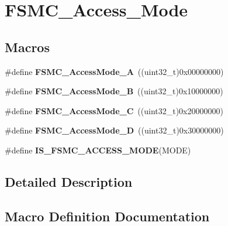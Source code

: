 \hypertarget{group___f_s_m_c___access___mode}{}\section{F\+S\+M\+C\+\_\+\+Access\+\_\+\+Mode}
\label{group___f_s_m_c___access___mode}
\subsection*{Macros}
\begin{DoxyCompactItemize}
\item 
\hypertarget{group___f_s_m_c___access___mode_gae0f299b51c12257311694c4a8f5c00c3}{}\#define {\bfseries F\+S\+M\+C\+\_\+\+Access\+Mode\+\_\+\+A}~((uint32\+\_\+t)0x00000000)\label{group___f_s_m_c___access___mode_gae0f299b51c12257311694c4a8f5c00c3}

\item 
\hypertarget{group___f_s_m_c___access___mode_ga2d6ce7481eb5e0e86fda727c646e4109}{}\#define {\bfseries F\+S\+M\+C\+\_\+\+Access\+Mode\+\_\+\+B}~((uint32\+\_\+t)0x10000000)\label{group___f_s_m_c___access___mode_ga2d6ce7481eb5e0e86fda727c646e4109}

\item 
\hypertarget{group___f_s_m_c___access___mode_ga83ffa035cf2e95c957b67a2e8b879e86}{}\#define {\bfseries F\+S\+M\+C\+\_\+\+Access\+Mode\+\_\+\+C}~((uint32\+\_\+t)0x20000000)\label{group___f_s_m_c___access___mode_ga83ffa035cf2e95c957b67a2e8b879e86}

\item 
\hypertarget{group___f_s_m_c___access___mode_ga7c632e7ebeb0c0ab4919bb60b8714c7b}{}\#define {\bfseries F\+S\+M\+C\+\_\+\+Access\+Mode\+\_\+\+D}~((uint32\+\_\+t)0x30000000)\label{group___f_s_m_c___access___mode_ga7c632e7ebeb0c0ab4919bb60b8714c7b}

\item 
\#define {\bfseries I\+S\+\_\+\+F\+S\+M\+C\+\_\+\+A\+C\+C\+E\+S\+S\+\_\+\+M\+O\+D\+E}(M\+O\+D\+E)
\end{DoxyCompactItemize}


\subsection{Detailed Description}


\subsection{Macro Definition Documentation}
\hypertarget{group___f_s_m_c___access___mode_ga1844335f297ea30e9d7fae09ce562092}{}

